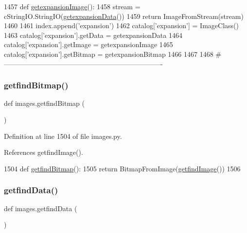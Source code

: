 \begin{DoxyCode}
1457 \textcolor{keyword}{def }\hyperlink{namespaceimages_aecaae36574467d350121a9514607aaa0}{getexpansionImage}():
1458     stream = cStringIO.StringIO(\hyperlink{namespaceimages_ac8cc40b8acd6eebb42a77ab79cc39b24}{getexpansionData}())
1459     \textcolor{keywordflow}{return} ImageFromStream(stream)
1460 
1461 index.append(\textcolor{stringliteral}{'expansion'})
1462 catalog[\textcolor{stringliteral}{'expansion'}] = ImageClass()
1463 catalog[\textcolor{stringliteral}{'expansion'}].getData = getexpansionData
1464 catalog[\textcolor{stringliteral}{'expansion'}].getImage = getexpansionImage
1465 catalog[\textcolor{stringliteral}{'expansion'}].getBitmap = getexpansionBitmap
1466 
1467 
1468 \textcolor{comment}{#----------------------------------------------------------------------}
\end{DoxyCode}
\mbox{\label{namespaceimages_ada26a62bbc12c4a9c2f32e893ced1842}} 
\subsubsection{\texorpdfstring{getfind\+Bitmap()}{getfindBitmap()}}
{\footnotesize\ttfamily def images.\+getfind\+Bitmap (\begin{DoxyParamCaption}{ }\end{DoxyParamCaption})}



Definition at line 1504 of file images.\+py.



References getfind\+Image().


\begin{DoxyCode}
1504 \textcolor{keyword}{def }\hyperlink{namespaceimages_ada26a62bbc12c4a9c2f32e893ced1842}{getfindBitmap}():
1505     \textcolor{keywordflow}{return} BitmapFromImage(\hyperlink{namespaceimages_a826840371cb79df70eac1eba3add721d}{getfindImage}())
1506 
\end{DoxyCode}
\mbox{\label{namespaceimages_a6a60138ccf8d2891b14779cc5e54c1bd}} 
\subsubsection{\texorpdfstring{getfind\+Data()}{getfindData()}}
{\footnotesize\ttfamily def images.\+getfind\+Data (\begin{DoxyParamCaption}{ }\end{DoxyParamCaption})}



